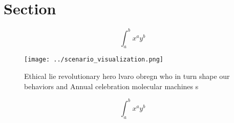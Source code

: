 \documentclass[a4paper]{article}
\begin{document}
\section{Section}

\[ \int_{a}^{b}{x^{a}y^{b}} \]

\begin{figure}
\centering
\texttt{[image: ../scenario\_visualization.png]}
\caption{Ethical lie revolutionary hero lvaro obregn who in turn shape our behaviors and Annual celebration molecular machines s
}
\end{figure}
 
\[ \int_{a}^{b}{x^{a}y^{b}} \]
\end{document}
